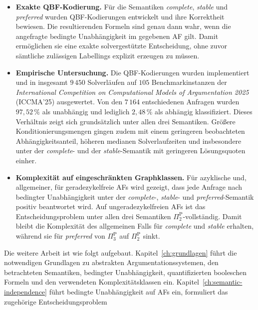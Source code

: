\begin{itemize}
    \item
    \textbf{Exakte QBF-Kodierung.}
    Für die Semantiken \emph{complete}, \emph{stable} und
    \emph{preferred} wurden QBF-Kodierungen entwickelt und ihre
    Korrektheit bewiesen. Die resultierenden Formeln sind genau dann wahr,
    wenn die angefragte bedingte Unabhängigkeit im gegebenen AF gilt.
    Damit ermöglichen sie eine exakte solvergestützte Entscheidung, ohne
    zuvor sämtliche zulässigen Labellings explizit erzeugen zu müssen.

    \item
    \textbf{Empirische Untersuchung.}
    Die QBF-Kodierungen wurden implementiert und in insgesamt
    \(9\,450\) Solverläufen auf \(105\) Benchmarkinstanzen der
    \emph{International Competition on Computational Models of
    Argumentation 2025} (ICCMA'25)
    \cite{bistarelli:2025:iccma,apostolakis:2025:iccma-instances}
    ausgewertet. Von den \(7\,164\) entschiedenen Anfragen wurden
    \(97{,}52\,\%\) als unabhängig und lediglich \(2{,}48\,\%\) als
    abhängig klassifiziert. Dieses Verhältnis zeigt sich grundsätzlich
    unter allen drei Semantiken. Größere Konditionierungsmengen gingen
    zudem mit einem geringeren beobachteten Abhängigkeitsanteil, höheren
    medianen Solverlaufzeiten und insbesondere unter der
    \emph{complete}- und der \emph{stable}-Semantik mit geringeren
    Lösungsquoten einher.

    \item
    \textbf{Komplexität auf eingeschränkten Graphklassen.}
    Für azyklische und, allgemeiner, für geradezykelfreie AFs wird
    gezeigt, dass jede Anfrage nach bedingter Unabhängigkeit unter der
    \emph{complete}-, \emph{stable}- und
    \emph{preferred}-Semantik positiv beantwortet wird. Auf
    ungeradezykelfreien AFs ist das Entscheidungsproblem unter allen
    drei Semantiken \(\Pi_2^{\mathrm{P}}\)-vollständig. Damit bleibt die
    Komplexität des allgemeinen Falls für \emph{complete} und
    \emph{stable} erhalten, während sie für \emph{preferred} von
    \(\Pi_3^{\mathrm{P}}\) auf \(\Pi_2^{\mathrm{P}}\) sinkt.
\end{itemize}
Die weitere Arbeit ist wie folgt aufgebaut. Kapitel~\ref{ch:grundlagen} führt die
notwendigen Grundlagen zu abstrakten Argumentationssystemen, den
betrachteten Semantiken, bedingter Unabhängigkeit, quantifizierten
booleschen Formeln und den verwendeten Komplexitätsklassen ein.
Kapitel~\ref{ch:semantic-independence} führt bedingte
Unabhängigkeit auf AFs ein, formuliert das zugehörige Entscheidungsproblem
